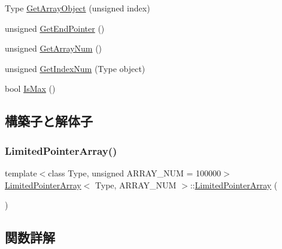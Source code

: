 \begin{DoxyCompactItemize}
\item 
Type \mbox{\hyperlink{class_limited_pointer_array_aae48443929a3766e602eb96f515c3a34}{Get\+Array\+Object}} (unsigned index)
\item 
unsigned \mbox{\hyperlink{class_limited_pointer_array_a4c070b87cde4d2ea173aa28918af6223}{Get\+End\+Pointer}} ()
\item 
unsigned \mbox{\hyperlink{class_limited_pointer_array_a404c188412a49f58ecacabd41c974de2}{Get\+Array\+Num}} ()
\item 
unsigned \mbox{\hyperlink{class_limited_pointer_array_a2b9d42b57662f29f357b2faf1793aa66}{Get\+Index\+Num}} (Type object)
\item 
bool \mbox{\hyperlink{class_limited_pointer_array_a8bd3a7ea969f307c35934a1bf2803b40}{Is\+Max}} ()
\end{DoxyCompactItemize}


\subsection{構築子と解体子}
\mbox{\label{class_limited_pointer_array_acab3e47d77fcd7ed7735a735e1aaf8f9}} 
\subsubsection{\texorpdfstring{Limited\+Pointer\+Array()}{LimitedPointerArray()}}
{\footnotesize\ttfamily template$<$class Type, unsigned A\+R\+R\+A\+Y\+\_\+\+N\+UM = 100000$>$ \\
\mbox{\hyperlink{class_limited_pointer_array}{Limited\+Pointer\+Array}}$<$ Type, A\+R\+R\+A\+Y\+\_\+\+N\+UM $>$\+::\mbox{\hyperlink{class_limited_pointer_array}{Limited\+Pointer\+Array}} (\begin{DoxyParamCaption}{ }\end{DoxyParamCaption})\hspace{0.3cm}{\ttfamily [inline]}}



\subsection{関数詳解}
\mbox{\label{class_limited_pointer_array_a57eb08357204668710021965425f4f46}} 
